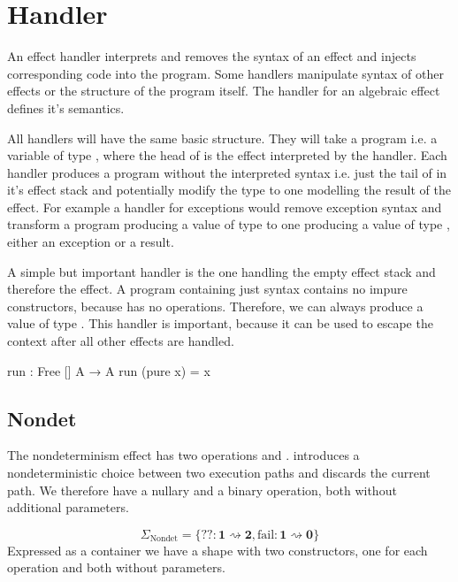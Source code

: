 \section{Handler}

An effect handler interprets and removes the syntax of an effect and injects
corresponding code into the program.
Some handlers manipulate syntax of other effects or the structure of the program
itself.
The handler for an algebraic effect defines it's semantics.

All handlers will have the same basic structure.
They will take a program i.e. a variable of type
\AgdaSpace{}\AgdaSpace{}
, where the head of  is the effect interpreted by the handler.
Each handler produces a program without the interpreted syntax i.e. just the
tail of  in it's effect stack and potentially modify the type
 to one modelling the result of the effect.
For example a handler for exceptions would remove exception syntax and transform
a program producing a value of type  to one producing a value of
type \AgdaSpace{}\AgdaSpace{},
either an exception or a result.

A simple but important handler is the one handling the empty effect stack and
therefore the  effect.
A program containing just  syntax contains no impure
constructors, because  has no operations.
Therefore, we can always produce a value of type .
This handler is important, because it can be used to escape the
 context after all other effects are handled.

\begin{code}
run : Free [] A → A
run (pure x) = x
\end{code}

\subsection{Nondet}
\label{nondeterminism}

The nondeterminism effect has two operations  and
.
 introduces a nondeterministic choice between two execution
paths and  discards the current path.
We therefore have a nullary and a binary operation, both without additional
parameters.

$$
\Sigma_{\text{Nondet}} = \{ ?\!? : \mathbf{1} \rightsquigarrow \mathbf{2}, \mathrm{fail} : \mathbf{1} \rightsquigarrow \mathbf{0} \}
$$
Expressed as a container we have a shape with two constructors, one for each
operation and both without parameters.

